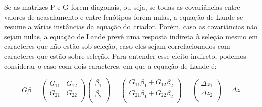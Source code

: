 \begin{refsection}
Se as matrizes P e G forem diagonais, ou seja, se todas as covariâncias entre
valores de acasalamento e entre fenótipos forem nulas, a equação de Lande se
resume a várias instâncias da equação do criador. Porém, caso as covariâncias
não sejam nulas, a equação de Lande prevê uma resposta indireta à seleção
mesmo em caracteres que não estão sob seleção, caso eles sejam
correlacionados com caracteres que estão sobre seleção. Para entender esse
efeito indireto, podemos considerar o caso com dois caracteres, em que a
equação de Lande é:

\begin{equation}
G\beta  =
\left (
\begin{matrix}
G_{11} & G_{12} \\
G_{21} & G_{22} \\
\end{matrix}
\right )
\left (
\begin{matrix}
\beta_{1}  \\
\beta_{2}   \\
\end{matrix}
\right )
=
\left (
\begin{matrix}
G_{11}\beta_{1} +  G_{12}\beta_{2} \\
G_{21}\beta_{1} +  G_{22}\beta_{2} \\
\end{matrix}
\right )
=
\left (
\begin{matrix}
\Delta z_{1}  \\
\Delta z_{2}   \\
\end{matrix}
\right )
=
\Delta z
\end{equation}


\end{refsection}
